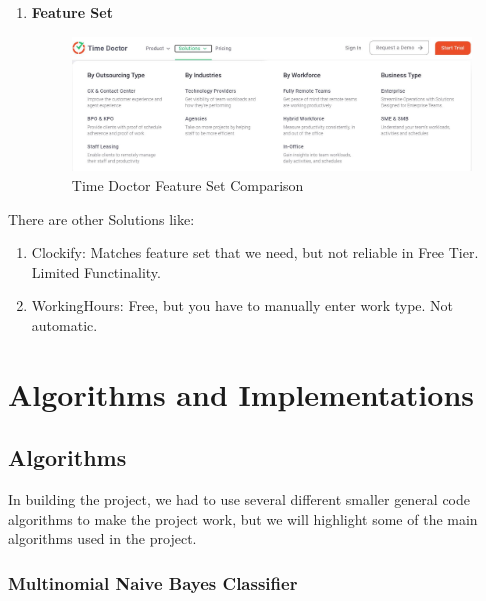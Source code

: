 \documentclass[openany]{report}
\begin{document}
\begin{enumerate}
    \item \textbf{Feature Set}
          \begin{figure}[H]
              \centering
              \includegraphics[width=.95\textwidth]{time doctor features.jpg}
              \caption{Time Doctor Feature Set Comparison}
          \end{figure}

\end{enumerate}

There are other Solutions like:
\begin{enumerate}
    \item Clockify: Matches feature set that we need, but not reliable in Free Tier. Limited Functinality.
    \item WorkingHours: Free, but you have to manually enter work type. Not automatic.
\end{enumerate}

\chapter{Algorithms and Implementations}


\section{Algorithms}
In building the project, we had to use several different smaller general code algorithms to make the project work, but we will highlight some of the main algorithms used in the project.\\


\subsection{Multinomial Naive Bayes Classifier}
\end{document}
